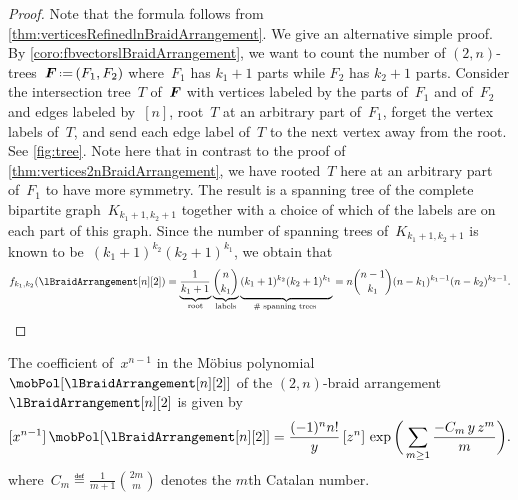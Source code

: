 \begin{proof}
Note that the formula follows from \cref{thm:verticesRefinedlnBraidArrangement}.
We give an alternative simple proof.
By \cref{coro:fbvectorslBraidArrangement}, we want to count the number of $(2,n)$-trees~$\b{F} \eqdef (F_1,F_2)$ where~$F_1$ has $k_1+1$ parts while $F_2$ has $k_2+1$ parts.
Consider the intersection tree~$T$ of~$\boldsymbol{F}$ with vertices labeled by the parts of~$F_1$ and of~$F_2$ and edges labeled by~$[n]$, root~$T$ at an arbitrary part of~$F_1$, forget the vertex labels of~$T$, and send each edge label of~$T$ to the next vertex away from the root.
See \cref{fig:tree}.
Note here that in contrast to the proof of \cref{thm:vertices2nBraidArrangement}, we have rooted~$T$ here at an arbitrary part of~$F_1$ to have more symmetry.
The result is a spanning tree of the complete bipartite graph~$K_{k_1+1, k_2+1}$ together with a choice of which of the labels are on each part of this graph.
Since the number of spanning trees of~$K_{k_1+1, k_2+1}$ is known to be~$(k_1+1)^{k_2} (k_2+1)^{k_1}$, we obtain that
\[
f_{k_1, k_2}(\lBraidArrangement[n][2]) = \underbrace{\frac{1}{k_1+1}  \phantom{\!\!\!\!\bigg)}}_{\text{root}} \underbrace{\binom{n}{k_1}}_{\text{labels}} \underbrace{(k_1+1)^{k_2} (k_2+1)^{k_1} \phantom{\!\!\!\!\bigg)}}_{\# \text{ spanning trees }} = n \binom{n-1}{k_1} (n-k_1)^{k_1-1} (n-k_2)^{k_2-1}.
\qedhere
\]
\end{proof}


\begin{theorem}
\label{thm:facets2BraidArrangement}
The coefficient of~$x^{n-1}$ in the M\"obius polynomial~$\mobPol[{\lBraidArrangement[n][2]}]$ of the $(2,n)$-braid arrangement~$\lBraidArrangement[n][2]$ is given by
\[
[x^{n-1}] \, \mobPol[{\lBraidArrangement[n][2]}] = \frac{(-1)^n n!}{y} \, [z^n] \, \exp \bigg( \sum_{m \ge 1} \frac{- C_m \, y \, z^m}{m} \bigg).
\]
where~$\displaystyle C_m \eqdef \frac{1}{m+1} \binom{2m}{m}$ denotes the $m$th Catalan number.
\end{theorem}

